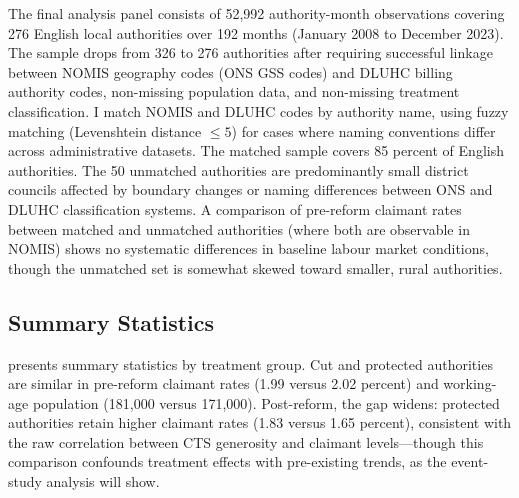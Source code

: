 \documentclass[12pt]{article}
\begin{document}
The final analysis panel consists of 52,992 authority-month observations covering 276 English local authorities over 192 months (January 2008 to December 2023). The sample drops from 326 to 276 authorities after requiring successful linkage between NOMIS geography codes (ONS GSS codes) and DLUHC billing authority codes, non-missing population data, and non-missing treatment classification. I match NOMIS and DLUHC codes by authority name, using fuzzy matching (Levenshtein distance $\leq 5$) for cases where naming conventions differ across administrative datasets. The matched sample covers 85 percent of English authorities. The 50 unmatched authorities are predominantly small district councils affected by boundary changes or naming differences between ONS and DLUHC classification systems. A comparison of pre-reform claimant rates between matched and unmatched authorities (where both are observable in NOMIS) shows no systematic differences in baseline labour market conditions, though the unmatched set is somewhat skewed toward smaller, rural authorities.

\subsection{Summary Statistics}

 presents summary statistics by treatment group. Cut and protected authorities are similar in pre-reform claimant rates (1.99 versus 2.02 percent) and working-age population (181,000 versus 171,000). Post-reform, the gap widens: protected authorities retain higher claimant rates (1.83 versus 1.65 percent), consistent with the raw correlation between CTS generosity and claimant levels---though this comparison confounds treatment effects with pre-existing trends, as the event-study analysis will show.
\end{document}
